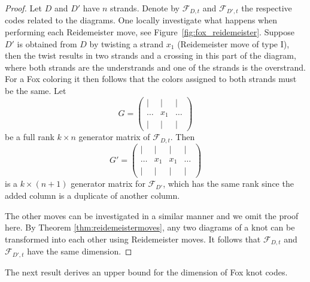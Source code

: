 \documentclass[11pt,a4paper]{article}
\theoremstyle{definition}
\newcommand{\mF}{\mathcal{F}}
\begin{document}
\begin{proof}
Let $D$ and $D'$ have $n$ strands. Denote by $\mF_{D,t}$ and $\mF_{D',t}$ the respective codes related to the diagrams. One locally investigate what happens when performing each Reidemeister move, see 
Figure~\ref{fig:fox_reidemeister}. Suppose $D'$ is obtained from $D$ by twisting a strand $x_1$ (Reidemeister move of type I), then the twist results in two strands and a crossing in this part of the diagram, where both strands are the understrands and one of the strands is the overstrand. For a Fox coloring it then follows that the colors assigned to both strands must be the same. 
    Let 
    $$G = 
    \begin{pmatrix}
     | & | & | \\
    \dots & x_1 & \dots \\
    | & | & |
    \end{pmatrix}
    $$ 
    be a full rank $k \times n$ generator matrix of $\mF_{D,t}$.
    Then    $$G' = 
    \begin{pmatrix}
    | & | & | & |\\
    \dots & x_1 & x_1 & \dots\\
    | & | & | & | 
    \end{pmatrix}
    $$ 
    is a $k \times (n+1)$ generator matrix for $\mF_{D'}$, which has the same rank since the added column is a duplicate of another column.

    The other moves can be investigated
    in a similar manner and we omit the proof here. By Theorem \ref{thm:reidemeistermoves},
any two diagrams of a knot can be transformed into each other using Reidemeister moves. It follows that $\mF_{D,t}$ and $\mF_{D',t}$ have the same dimension.
\end{proof}



The next result derives an upper bound for the dimension of Fox knot codes. 
\end{document}
